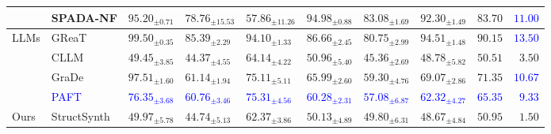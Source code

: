 \begin{table}[ht]
{\begin{tabular}{ll llllll cr}
    & SPADA-NF & $95.20_{\pm 0.71}$ & $78.76_{\pm 15.53}$ & $\boldsymbol{57.86_{\pm 11.26}}$ & $94.98_{\pm 0.88}$ & $83.08_{\pm 1.69}$ & $92.30_{\pm 1.49}$ & $83.70$ & \textcolor{blue}{$11.00$} \\
    \midrule
    \multirow{4}{*}{LLMs} & GReaT & $99.50_{\pm 0.35}$ & $85.39_{\pm 2.29}$ & $94.10_{\pm 1.33}$ & $86.66_{\pm 2.45}$ & $80.75_{\pm 2.99}$ & $94.51_{\pm 1.48}$ & $90.15$ & \textcolor{blue}{$13.50$} \\
    & CLLM & $49.45_{\pm 3.85}$ & $44.37_{\pm 4.55}$ & $64.14_{\pm 4.22}$ & \underline{$50.96_{\pm 5.40}$} & $45.36_{\pm 2.69}$ & $\boldsymbol{48.78_{\pm 5.82}}$ & $\boldsymbol{50.51}$ & \underline{$3.50$} \\
    & GraDe & $97.51_{\pm 1.60}$ & $61.14_{\pm 1.94}$ & $75.11_{\pm 5.11}$ & $65.99_{\pm 2.60}$ & $59.30_{\pm 4.76}$ & $69.07_{\pm 2.86}$ & $71.35$ & \textcolor{blue}{$10.67$} \\
    & \textcolor{blue}{PAFT} & \textcolor{blue}{$76.35_{\pm 3.68}$} & \textcolor{blue}{$60.76_{\pm 3.46}$} & \textcolor{blue}{$75.31_{\pm 4.56}$} & \textcolor{blue}{$60.28_{\pm 2.31}$} & \textcolor{blue}{$57.08_{\pm 6.87}$} & \textcolor{blue}{$62.32_{\pm 4.27}$} & \textcolor{blue}{$65.35$} & \textcolor{blue}{$9.33$} \\
    \midrule
    \multirow{1}{*}{Ours} & StructSynth & $\boldsymbol{49.97_{\pm 5.78}}$ & \underline{$44.74_{\pm 5.13}$} & \underline{$62.37_{\pm 3.86}$} & $\boldsymbol{50.13_{\pm 4.89}}$ & $\boldsymbol{49.80_{\pm 6.31}}$ & \underline{$48.67_{\pm 4.84}$} & $50.95$ & $\boldsymbol{1.50}$ \\


\end{tabular}}
\end{table}
